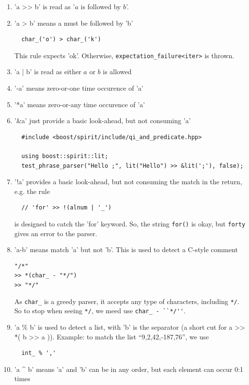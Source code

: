 \begin{enumerate}
  \item  'a >> b' is read as '$a$ is followed by $b$'.
  \item 'a > b' means a must be followed by 'b'
  \begin{verbatim}
  char_('o') > char_('k')
  \end{verbatim}
  This rule expects 'ok'. Otherwise, \verb!expectation_failure<iter>! is thrown.
  
  \item 'a | b' is read as either $a$ or $b$ is allowed
  \item '-a' means zero-or-one time occurence of 'a'
  \item '*a' means zero-or-any time occurence of 'a'
  \item '\&a' just provide a basic look-ahead, but not consuming 'a'
  \begin{verbatim}
  #include <boost/spirit/include/qi_and_predicate.hpp>
  
  using boost::spirit::lit;
  test_phrase_parser("Hello ;", lit("Hello") >> &lit(';'), false);
  \end{verbatim}
  
  \item  '!a' provides a basic look-ahead, but not consuming the match in the
  return, e.g. the rule
  \begin{verbatim}
  // 'for' >> !(alnum | '_')  
  \end{verbatim}
  is designed to catch the 'for' keyword. So, the string \verb!for()! is okay,
  but \verb!forty! gives an error to the parser.
  
  
  \item 'a-b' means match 'a' but not 'b'. This is used to detect a
  C-style comment
  \begin{verbatim}
"/*"
>> *(char_ - "*/")
>> "*/"
  \end{verbatim}
  As \verb!char_! is a greedy parser, it accepts any type of characters,
  including \verb!*/!. So to stop when seeing \verb!*/!, we meed use 
  \verb!char_ - ``*/''!.
  
  
  \item 'a \% b' is used to detect a list, with 'b' is the separator (a short
  cut for a >> *( b >> a )). Example: to match the list ``9,2,42,-187,76'', we
  use
  \begin{verbatim}
  int_ % ','
  \end{verbatim}
  
  \item 'a \^{} b' means 'a' and 'b' can be in any order, but each element can
  occur 0:1 times
\end{enumerate}

